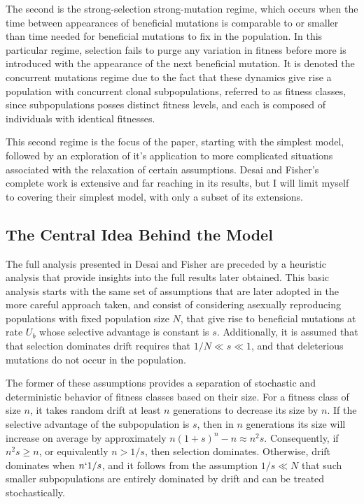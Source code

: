 \documentclass[12pt]{article}
\begin{document}
The second is the strong-selection strong-mutation regime, which occurs when the time between appearances of beneficial mutations is comparable to or smaller than time needed for beneficial mutations to fix in the population.  In this particular regime, selection fails to purge any variation in fitness before more is introduced with the appearance of the next beneficial mutation.  It is denoted the concurrent mutations regime due to the fact that these dynamics give rise a population with concurrent clonal subpopulations, referred to as fitness classes, since subpopulations posses distinct fitness levels, and each is composed of individuals with identical fitnesses.  

This second regime is the focus of the paper, starting with the simplest model, followed by an exploration of it's application to more complicated situations associated with the relaxation of certain assumptions.  Desai and Fisher's complete work is extensive and far reaching in its results, but I will limit myself to covering their simplest model, with only a subset of its extensions. 

\subsection*{The Central Idea Behind the Model}
The full analysis presented in Desai and Fisher are preceded by a heuristic analysis that provide insights into the full results later obtained.  This basic analysis starts with the same set of assumptions that are later adopted in the more careful approach taken, and consist of considering asexually reproducing populations with fixed population size $N$, that give rise to beneficial mutations at rate $U_b$ whose selective advantage is constant is $s$.  Additionally, it is assumed that that selection dominates drift requires that $1/N \ll s \ll 1$, and that deleterious mutations do not occur in the population. 

The former of these assumptions provides a separation of stochastic and deterministic behavior of fitness classes based on their size.  For a fitness class of size $n$, it takes random drift at least $n$ generations to decrease its size by $n$.  If the selective advantage of the subpopulation is $s$, then in $n$ generations its size will increase on average by approximately $n(1+s)^n-n \approx n^2s$.  Consequently, if $n^2s \ge n$, or equivalently $n>1/s$, then selection dominates.  Otherwise, drift dominates when $n\lq 1/s$, and it follows from the assumption $1/s \ll N$ that such smaller subpopulations are entirely dominated by drift and can be treated stochastically.
\end{document}

